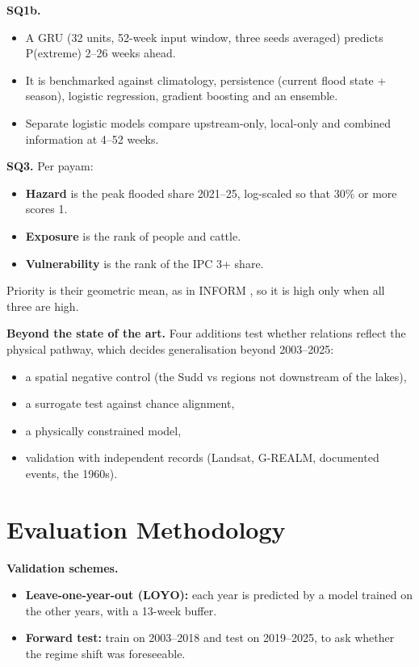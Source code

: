 \documentclass[11pt,a4paper]{article}
\begin{document}
\textbf{SQ1b.}
\begin{itemize}\setlength\itemsep{0pt}
\item A GRU \cite{cho2014} (32 units, 52-week input window, three seeds averaged) predicts P(extreme) 2--26 weeks
ahead.
\item It is benchmarked against climatology, persistence (current flood state + season), logistic regression,
gradient boosting and an ensemble.
\item Separate logistic models compare upstream-only, local-only and combined information at 4--52 weeks.
\end{itemize}

\textbf{SQ3.} Per payam:
\begin{itemize}\setlength\itemsep{0pt}
\item \textbf{Hazard} is the peak flooded share 2021--25, log-scaled so that 30\% or more scores 1.
\item \textbf{Exposure} is the rank of people and cattle.
\item \textbf{Vulnerability} is the rank of the IPC 3+ share.
\end{itemize}
Priority is their geometric mean, as in INFORM \cite{inform2017}, so it is high only when all three are high.

\textbf{Beyond the state of the art.} Four additions test whether relations reflect the physical pathway, which decides
generalisation beyond 2003--2025:
\begin{itemize}\setlength\itemsep{0pt}
\item a spatial negative control (the Sudd vs regions not downstream of the lakes),
\item a surrogate test against chance alignment,
\item a physically constrained model,
\item validation with independent records (Landsat, G-REALM, documented events, the 1960s).
\end{itemize}

\section{Evaluation Methodology}
\textbf{Validation schemes.}
\begin{itemize}\setlength\itemsep{0pt}
\item \textbf{Leave-one-year-out (LOYO):} each year is predicted by a model trained on the other years, with a 13-week
buffer.
\item \textbf{Forward test:} train on 2003--2018 and test on 2019--2025, to ask whether the regime shift was
foreseeable.
\end{itemize}
\end{document}

